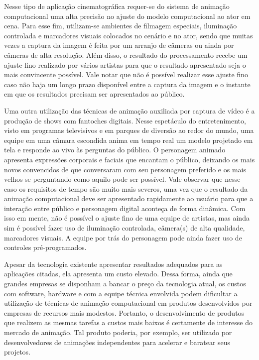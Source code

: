Nesse tipo de aplicação cinematográfica requer-se do sistema de animação
computacional uma alta precisão no ajuste do modelo computacional ao ator em
cena. Para esse fim, utilizam-se ambientes de filmagem especiais, iluminação 
controlada e marcadores visuais colocados no cenário e no ator, sendo que muitas vezes a
captura da imagem é feita por um arranjo de câmeras ou ainda por câmeras de alta
resolução. Além disso, o resultado do processamento recebe um ajuste fino
realizado por vários artistas para que o resultado apresentado seja o mais
convincente possível. Vale notar que não é possível realizar esse ajuste fino
caso não haja um longo prazo disponível entre a captura da imagem e o instante
em que os resultados precisam ser apresentados ao público.

Uma outra utilização das técnicas de animação auxiliada por captura de vídeo é a
produção de shows com fantoches digitais.  Nesse espetáculo do entretenimento,
visto em programas televisivos e em parques de diversão ao redor do mundo, uma
equipe em uma câmara escondida anima em tempo real um modelo projetado em tela e
responde ao vivo às perguntas do público. O personagem animado apresenta
expressões corporais e faciais que encantam o público, deixando os mais novos
convencidos de que conversaram com seu personagem preferido e os mais velhos se
perguntando como aquilo pode ser possível. Vale observar que nesse caso os
requisitos de tempo são muito mais severos, uma vez que o resultado da animação
computacional deve ser apresentado rapidamente ao usuário para que a interação
entre público e personagem digital aconteça de forma dinâmica. Com isso em
mente, não é possível o ajuste fino de uma equipe de artistas, mas ainda sim é
possível fazer uso de iluminação controlada, câmera(s) de alta qualidade,
marcadores visuais. A equipe por trás do personagem pode ainda fazer uso de
controles pré-programados.

Apesar da tecnologia existente apresentar resultados adequados para as
aplicações citadas, ela apresenta um custo elevado. Dessa forma, ainda que
grandes empresas se disponham a bancar o preço da tecnologia atual, os custos
com software, hardware e com a equipe técnica envolvida podem dificultar a
utilização de técnicas de animação computacional em produtos desenvolvidos por
empresas de recursos mais modestos.  Portanto, o desenvolvimento de produtos que
realizem as mesmas tarefas a custos mais baixos é certamente de interesse do
mercado de animação. Tal produto poderia, por exemplo, ser utilizado por
desenvolvedores de animações independentes para acelerar e baratear seus
projetos.  


